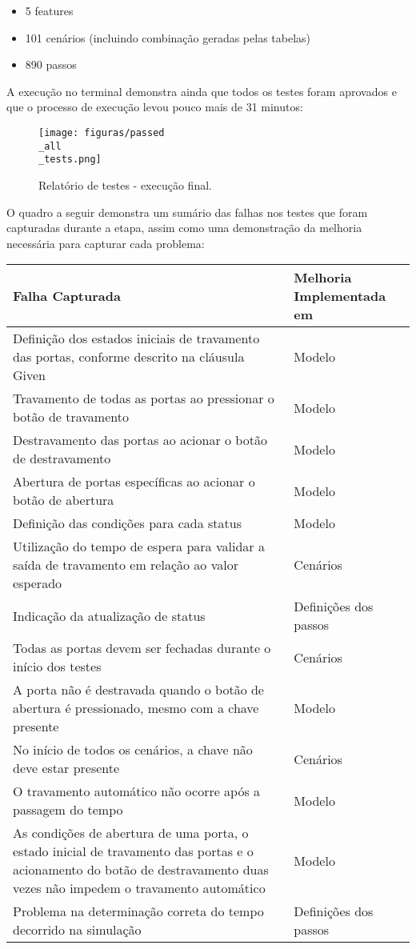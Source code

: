 \begin{itemize}
    \item 5 features
    \item 101 cenários (incluindo combinação geradas pelas tabelas)
    \item 890 passos
\end{itemize}

A execução no terminal demonstra ainda que todos os testes foram aprovados e que o processo de execução levou pouco mais de 31 minutos:

\begin{figure}[H]
\centering
\texttt{[image: figuras/passed\\\_all\\\_tests.png]}
\caption{Relatório de testes - execução final.}
\end{figure}

O quadro a seguir demonstra um sumário das falhas nos testes que foram capturadas durante a etapa, assim como uma demonstração da melhoria 
necessária para capturar cada problema:

\begin{quadro}[H]
\caption{Falhas de comportamento capturadas durante a modelagem iterativa}
\label{qua:falhas}
\begin{tabular}{|p{5cm}|p{7cm}|}
\hline
Falha Capturada & Melhoria Implementada em \\ 
\hline
Definição dos estados iniciais de travamento das portas, conforme descrito na cláusula Given & Modelo \\
\hline
Travamento de todas as portas ao pressionar o botão de travamento & Modelo \\
\hline
Destravamento das portas ao acionar o botão de destravamento & Modelo \\
\hline
Abertura de portas específicas ao acionar o botão de abertura & Modelo \\
\hline
Definição das condições para cada status & Modelo \\
\hline
Utilização do tempo de espera para validar a saída de travamento em relação ao valor esperado & Cenários \\
\hline
Indicação da atualização de status & Definições dos passos \\
\hline
Todas as portas devem ser fechadas durante o início dos testes & Cenários \\
\hline
A porta não é destravada quando o botão de abertura é pressionado, mesmo com a chave presente & Modelo \\
\hline
No início de todos os cenários, a chave não deve estar presente & Cenários \\
\hline
O travamento automático não ocorre após a passagem do tempo & Modelo \\
\hline
As condições de abertura de uma porta, o estado inicial de travamento das portas e o acionamento do botão de destravamento duas vezes não impedem o travamento automático & Modelo \\
\hline
Problema na determinação correta do tempo decorrido na simulação & Definições dos passos  \\
\hline
\end{tabular}
\end{quadro}

